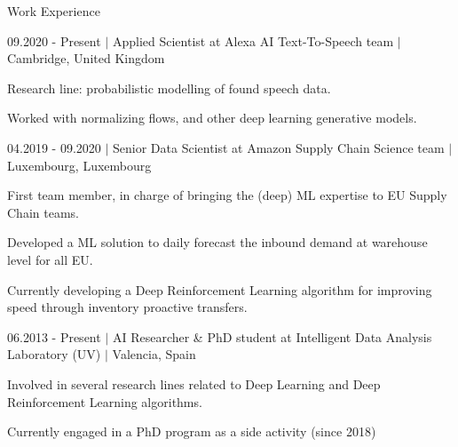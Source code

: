 \documentclass{resume} %
\begin{document}
\begin{rSection}{Work Experience} \itemsep -1pt
	
\begin{rSubsection}{09.2020 - Present $|$ Applied Scientist at Alexa AI Text-To-Speech team  $|$  \textnormal{Cambridge, United Kingdom}}{}{}
	
	\vspace{-3pt}
	
	\item Research line: probabilistic modelling of found speech data.
	\item Worked with normalizing flows, and other deep learning generative models.

\end{rSubsection}

\begin{rSubsection}{04.2019 - 09.2020 $|$ Senior Data Scientist at Amazon Supply Chain Science team  $|$  \textnormal{Luxembourg, Luxembourg}}{}{}

	\vspace{-3pt}

	\item First team member, in charge of bringing the (deep) ML expertise to EU Supply Chain teams.
	\item Developed a ML solution to daily forecast the inbound demand at warehouse level for all EU.
	\item Currently developing a Deep Reinforcement Learning algorithm for improving speed through inventory proactive transfers.
\end{rSubsection}


\vspace{-6pt}

\begin{rSubsection}{06.2013 - Present $|$ AI Researcher \& PhD student at Intelligent Data Analysis Laboratory (UV) $|$ \textnormal{Valencia, Spain}\hspace{-10pt}}{}{}

	\vspace{-3pt}

	\item Involved in several research lines related to Deep Learning and Deep Reinforcement Learning algorithms.
	\item Currently engaged in a PhD program as a side activity (since 2018)

\end{rSubsection}

\vspace{-6pt}


\end{rSection}
\end{document}
